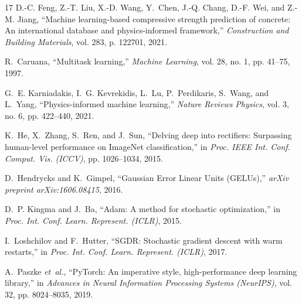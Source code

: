\documentclass[conference]{IEEEtran}
\begin{document}
\begin{thebibliography}{17}
D.-C. Feng, Z.-T. Liu, X.-D. Wang, Y.~Chen, J.-Q. Chang, D.-F. Wei, and Z.-M. Jiang, ``Machine learning-based compressive strength prediction of concrete: An international database and physics-informed framework,'' \textit{Construction and Building Materials}, vol. 283, p. 122701, 2021.

R.~Caruana, ``Multitask learning,'' \textit{Machine Learning}, vol. 28, no. 1, pp. 41--75, 1997.

G.~E. Karniadakis, I.~G. Kevrekidis, L.~Lu, P.~Perdikaris, S.~Wang, and L.~Yang, ``Physics-informed machine learning,'' \textit{Nature Reviews Physics}, vol. 3, no. 6, pp. 422--440, 2021.

K.~He, X.~Zhang, S.~Ren, and J.~Sun, ``Delving deep into rectifiers: Surpassing human-level performance on ImageNet classification,'' in \textit{Proc. IEEE Int. Conf. Comput. Vis. (ICCV)}, pp. 1026--1034, 2015.

D.~Hendrycks and K.~Gimpel, ``Gaussian Error Linear Units (GELUs),'' \textit{arXiv preprint arXiv:1606.08415}, 2016.

D.~P. Kingma and J.~Ba, ``Adam: A method for stochastic optimization,'' in \textit{Proc. Int. Conf. Learn. Represent. (ICLR)}, 2015.

I.~Loshchilov and F.~Hutter, ``SGDR: Stochastic gradient descent with warm restarts,'' in \textit{Proc. Int. Conf. Learn. Represent. (ICLR)}, 2017.

A.~Paszke \textit{et~al.}, ``PyTorch: An imperative style, high-performance deep learning library,'' in \textit{Advances in Neural Information Processing Systems (NeurIPS)}, vol. 32, pp. 8024--8035, 2019.

\end{thebibliography}
\end{document}
